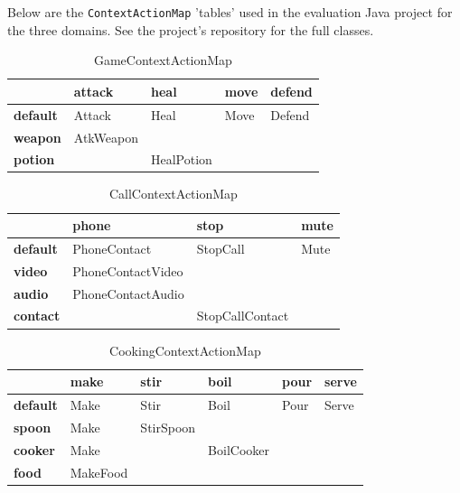 \documentclass[11pt]{article}
\begin{document}
Below are the \texttt{ContextActionMap} 'tables' used in the evaluation Java project for the three domains. See the project's repository for the full classes.

\begin{table}[H]
\centering
\caption{GameContextActionMap}
\label{evaluation-game-table}
\begin{tabular}{l|l|l|l|l}
                 & \textbf{attack} & \textbf{heal} & \textbf{move} & \textbf{defend} \\ \hline
\textbf{default} & Attack          & Heal          & Move          & Defend          \\ \hline
\textbf{weapon}  & AtkWeapon       &               &               &                 \\ \hline
\textbf{potion}  &                 & HealPotion    &               &                 \\
\end{tabular}
\end{table}

\begin{table}[H]
\centering
\caption{CallContextActionMap}
\label{evaluation-call-table}
\begin{tabular}{l|l|l|l}
                 & \textbf{phone}    & \textbf{stop}   & \textbf{mute} \\ \hline
\textbf{default} & PhoneContact      & StopCall        & Mute          \\ \hline
\textbf{video}   & PhoneContactVideo &                 &               \\ \hline
\textbf{audio}   & PhoneContactAudio &                 &               \\ \hline
\textbf{contact} &                   & StopCallContact &               \\ 
\end{tabular}
\end{table}

\begin{table}[H]
\centering
\caption{CookingContextActionMap}
\label{evaluation-cooking-table}
\begin{tabular}{l|l|l|l|l|l}
                 & \textbf{make} & \textbf{stir} & \textbf{boil} & \textbf{pour} & \textbf{serve} \\ \hline
\textbf{default} & Make          & Stir          & Boil          & Pour          & Serve          \\ \hline
\textbf{spoon}   & Make          & StirSpoon     &               &               &                \\ \hline
\textbf{cooker}  & Make          &               & BoilCooker    &               &                \\ \hline
\textbf{food}    & MakeFood      &               &               &               &                \\
\end{tabular}
\end{table}
\end{document}

